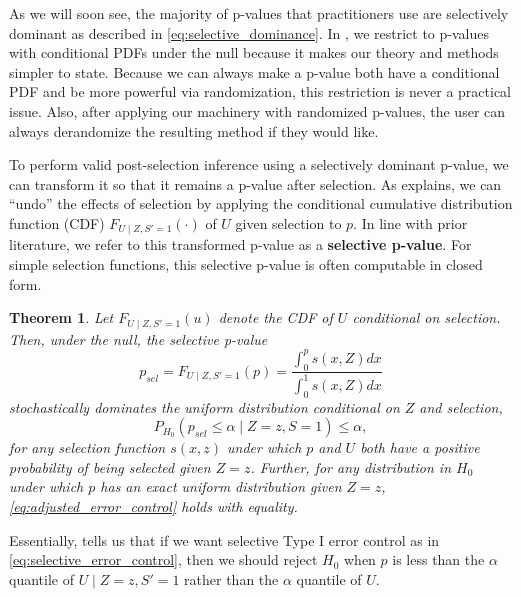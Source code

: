 \documentclass{article}
\newtheorem{theorem}{Theorem}
\begin{document}
As we will soon see, the majority of p-values that practitioners use are selectively dominant as described in \eqref{eq:selective_dominance}. In , we restrict to p-values with conditional PDFs under the null because it makes our theory and methods simpler to state. Because we can always make a p-value both have a conditional PDF and be more powerful via randomization, this restriction is never a practical issue. Also, after applying our machinery with randomized p-values, the user can always derandomize the resulting method if they would like. %

To perform valid post-selection inference using a selectively dominant p-value, we can transform it so that it remains a p-value after selection. As  explains, we can ``undo'' the effects of selection by applying the conditional cumulative distribution function (CDF) $F_{U \mid Z, S' = 1}(\cdot)$ of $U$ given selection to $p$. In line with prior literature, we refer to this transformed p-value as a \textbf{selective p-value}. For simple selection functions, this selective p-value is often computable in closed form. 

\begin{theorem}
    \label{thm:adjustment}
    Let  $F_{U \mid Z, S '= 1}(u)$ denote the CDF of $U$ conditional on selection. Then, under the null, the selective p-value 
    \begin{equation}
    \label{eq:adjustment}
        p_{sel} = F_{U \mid Z, S' = 1}(p) = \frac{\int_0^p s(x, Z) dx}{\int_0^1 s(x, Z) dx}
    \end{equation}
    stochastically dominates the uniform distribution conditional on $Z$ and selection,
    \begin{equation}
        \label{eq:adjusted_error_control}
        P_{H_0}(p_{sel} \leq \alpha \mid Z=z, S= 1) \leq \alpha, 
    \end{equation}
    for any selection function $s(x, z)$ under which $p$ and $U$ both have a positive probability of being selected given $Z=z$. Further, for any distribution in $H_0$ under which $p$ has an exact uniform distribution given $Z=z$, \eqref{eq:adjusted_error_control} holds with equality. 
\end{theorem}

Essentially,  tells us that if we want selective Type I error control as in \eqref{eq:selective_error_control}, then we should reject $H_0$ when $p$ is less than the $\alpha$ quantile of $U \mid Z=z, S' = 1$ rather than the $\alpha$ quantile of $U$. 
\end{document}
